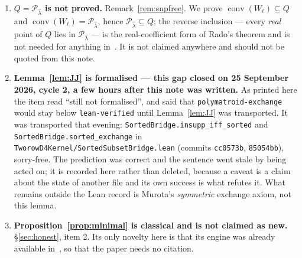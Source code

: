 \documentclass[11pt]{article}
\theoremstyle{plain}
\theoremstyle{definition}
\DeclareMathOperator{\conv}{conv}
\newcommand{\lhat}{\hat\lambda}
\newcommand{\Perm}{\mathcal{P}}
\begin{document}
\begin{enumerate}
\item \textbf{$Q=\Perm_{\lhat}$ is not proved.} Remark~\ref{rem:snpfree}. We
prove $\conv(W_\ell)\subseteq Q$ and $\conv(W_\ell)=\Perm_{\lhat}$, hence
$\Perm_{\lhat}\subseteq Q$; the reverse inclusion --- every \emph{real} point of
$Q$ lies in $\Perm_{\lhat}$ --- is the real-coefficient form of Rado's theorem
and is not needed for anything in~\cite{note1}. It is not claimed anywhere and
should not be quoted from this note.
\item \textbf{Lemma~\ref{lem:JJ} is formalised --- this gap closed on 25 September
2026, cycle 2, a few hours after this note was written.} As printed here the item
read ``still not formalised'', and said that \texttt{polymatroid-exchange} would
stay below \texttt{lean-verified} until Lemma~\ref{lem:JJ} was transported. It was
transported that evening: \texttt{SortedBridge.insupp\_iff\_sorted} and
\texttt{SortedBridge.sorted\_exchange} in
\texttt{TworowD4Kernel/SortedSubsetBridge.lean} (commits \texttt{cc0573b},
\texttt{85054bb}), sorry-free. The prediction was correct and the sentence went
stale by being acted on; it is recorded here rather than deleted, because a caveat
is a claim about the state of another file and its own success is what refutes it.
What remains outside the Lean record is Murota's \emph{symmetric} exchange axiom,
not this lemma.
\item \textbf{Proposition~\ref{prop:minimal} is classical and is not claimed as
new.} \S\ref{sec:honest}, item 2. Its only novelty here is that its engine was
already available in~\cite{note1}, so that the paper needs no citation.
\end{enumerate}
\end{document}

